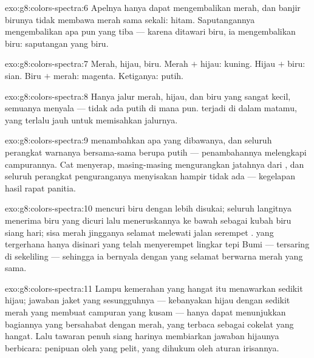 \begin{solution}{exo:g8:colors-spectra:6}
Apelnya hanya dapat mengembalikan merah, dan banjir birunya tidak
membawa merah sama sekali: hitam. Saputangannya mengembalikan apa pun
yang tiba --- karena ditawari biru, ia mengembalikan biru: saputangan
yang biru.
\end{solution}

\begin{solution}{exo:g8:colors-spectra:7}
Merah, hijau, biru. Merah $+$ hijau: kuning. Hijau $+$ biru: sian.
Biru $+$ merah: magenta. Ketiganya: putih.
\end{solution}

\begin{solution}{exo:g8:colors-spectra:8}
Hanya jalur merah, hijau, dan biru yang sangat kecil, semuanya
menyala --- tidak ada putih di mana pun.  terjadi di dalam
matamu, yang terlalu jauh untuk memisahkan jalurnya.
\end{solution}

\begin{solution}{exo:g8:colors-spectra:9}
 menambahkan apa yang dibawanya, dan seluruh perangkat warnanya
bersama-sama berupa putih --- penambahannya melengkapi campurannya.
Cat menyerap, masing-masing mengurangkan jatahnya dari , dan
seluruh perangkat penguranganya menyisakan hampir tidak ada ---
kegelapan hasil rapat panitia.
\end{solution}

\begin{solution}{exo:g8:colors-spectra:10}
 mencuri biru dengan lebih disukai; seluruh langitnya menerima
biru yang dicuri lalu meneruskannya ke bawah sebagai kubah biru siang
hari; sisa merah jingganya selamat melewati jalan serempet .  yang tergerhana hanya disinari  yang telah
menyerempet lingkar tepi Bumi --- tersaring  di
sekeliling  --- sehingga ia bernyala dengan yang selamat
berwarna merah yang sama.
\end{solution}

\begin{solution}{exo:g8:colors-spectra:11}
Lampu kemerahan yang hangat itu menawarkan sedikit hijau; jawaban
jaket yang sesungguhnya --- kebanyakan hijau dengan sedikit merah yang
membuat campuran yang kusam --- hanya dapat menunjukkan bagiannya yang
bersahabat dengan merah, yang terbaca sebagai cokelat yang hangat.
Lalu tawaran penuh siang harinya membiarkan jawaban hijaunya
berbicara:
penipuan oleh  yang pelit, yang dihukum oleh aturan irisannya.
\end{solution}

